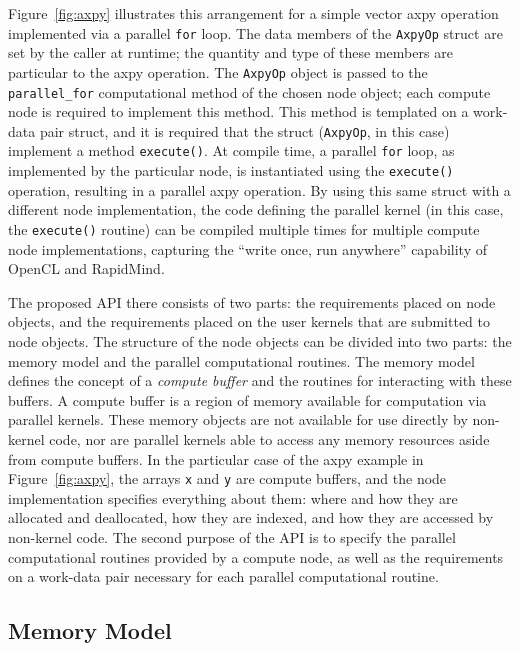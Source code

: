 \documentclass[10pt,conference,letterpaper]{IEEEtran}
\begin{document}
Figure~\ref{fig:axpy} illustrates this arrangement for a simple vector axpy operation implemented via a parallel \verb!for! loop. The data members of the \verb!AxpyOp! struct are set by the caller at runtime; the quantity and type of these members are particular to the axpy operation. The \verb!AxpyOp! object is passed to the \verb!parallel_for! computational method of the chosen node object; each compute node is required to implement this method. This method is templated on a work-data pair struct, and it is required that the struct (\verb!AxpyOp!, in this case) implement a method \verb!execute()!. At compile time, a parallel \verb!for! loop, as implemented by the particular node, is instantiated using the \verb!execute()! operation, resulting in a parallel axpy operation. By using this same struct with a different node implementation, the code defining the parallel kernel (in this case, the \verb!execute()! routine) can be compiled multiple times for multiple compute node implementations, capturing the ``write once, run anywhere'' capability of OpenCL and RapidMind.

The proposed API there consists of two parts: the requirements placed on node objects, and the requirements placed on the user kernels that are submitted to node objects. The structure of the node objects can be divided into two parts: the memory model and the parallel computational routines. The memory model defines the concept of a \emph{compute buffer} and the routines for interacting with these buffers. A compute buffer is a region of memory available for computation via parallel kernels. These memory objects are not available for use directly by non-kernel code, nor are parallel kernels able to access any memory resources aside from compute buffers. In the particular case of the axpy example in Figure~\ref{fig:axpy}, the arrays \verb!x! and \verb!y! are compute buffers, and the node implementation specifies everything about them: where and how they are allocated and deallocated, how they are indexed, and how they are accessed by non-kernel code. The second purpose of the API is to specify the parallel computational routines provided by a compute node, as well as the requirements on a work-data pair necessary for each parallel computational routine.

\subsection{Memory Model} 
\end{document}
